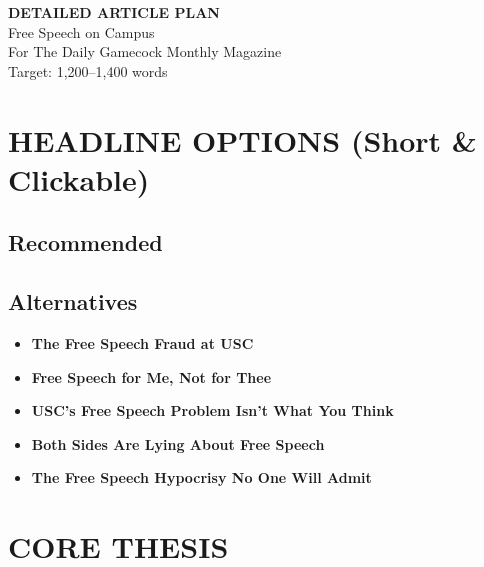 \documentclass[11pt,letterpaper]{article}
\begin{document}
\begin{center}
{\Huge\bfseries\color{garnet} DETAILED ARTICLE PLAN\\[0.3cm]}
{\Large Free Speech on Campus\\[0.5cm]}
{\large For The Daily Gamecock Monthly Magazine\\[0.3cm]}
{\normalsize Target: 1,200--1,400 words}
\end{center}

\vspace{1cm}

\section{HEADLINE OPTIONS (Short \& Clickable)}

\subsection{Recommended}
\begin{center}
\end{center}

\subsection{Alternatives}
\begin{itemize}[noitemsep]
    \item \textbf{The Free Speech Fraud at USC}
    \item \textbf{Free Speech for Me, Not for Thee}
    \item \textbf{USC's Free Speech Problem Isn't What You Think}
    \item \textbf{Both Sides Are Lying About Free Speech}
    \item \textbf{The Free Speech Hypocrisy No One Will Admit}
\end{itemize}

\section{CORE THESIS}
\end{document}
